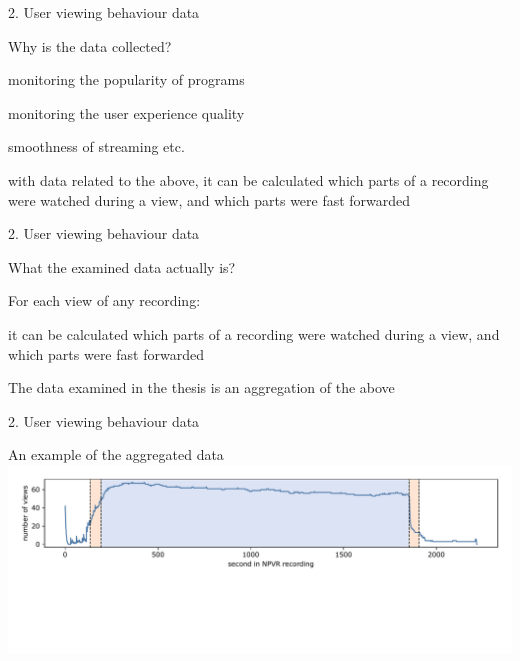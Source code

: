 \documentclass[first=orange,second=blue,logo=blueque]{aaltoslides}
\newcommand{\SubItem}[1]{
    {\setlength\itemindent{15pt} \item[$\bullet$] #1}
}
\begin{document}

\begin{frame}{2. User viewing behaviour data}
    \begin{block}{{\color{black}\alert{Why} is the data collected?}}
        \begin{itemize}
            \item monitoring the popularity of programs
            \item monitoring the user experience quality
                \SubItem{smoothness of streaming etc.}
                \SubItem{with data related to the above, \alert{it can be calculated which parts of a recording were watched during a view, and which parts were fast forwarded}}
        \end{itemize}
    \end{block}
\end{frame}


\begin{frame}{2. User viewing behaviour data}
    \begin{block}{{\color{black}\alert{What} the examined data actually is?}}
        \begin{itemize}
            \item For each view of any recording:
                \SubItem{\alert{it can be calculated which parts of a recording were watched during a view, and which parts were fast forwarded}}
            \item The data examined in the thesis is an aggregation of the above
        \end{itemize}
    \end{block}
\end{frame}


\begin{frame}{2. User viewing behaviour data}
    \begin{block}{{\color{black}An example of the aggregated data}}
        \includegraphics[width=1\textwidth]{figures/data0.pdf}
    \end{block}
\end{frame}
\end{document}
